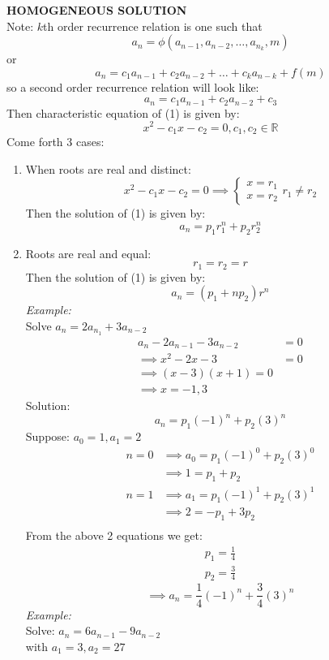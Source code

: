 \documentclass[11pt,letterpaper]{article}
\newenvironment{example}                             
        {\noindent\textit{Example:}\\}
	{}
\begin{document}
\textbf{HOMOGENEOUS SOLUTION}\\
Note: $k$th order recurrence relation is one such that\[
  a_n = \phi(a_{n-1},a_{n-2},\dots,a_{n_k},m)
\]
or 
\[
  a_n = c_1a_{n-1} + c_2a_{n-2} + \dots + c_ka_{n-k} +  f(m)
\]
so a second order recurrence relation will look like:
\begin{equation}
  a_n = c_1a_{n-1} + c_2a_{n-2} + c_3
\end{equation}
Then characteristic equation of (1) is given by:
\[
  x^2 - c_1x - c_2 = 0, c_1,c_2 \in \mathbb{R}
\]
Come forth 3 cases: 
\begin{enumerate}
  \item When roots are real and distinct: \\
    \[
      x^2 - c_1x-c_2 = 0 \implies\begin{cases}
        x = r_1 \\ 
        x = r_2
      \end{cases}
      r_1 \neq r_2
    \]
    Then the solution of (1) is given by:
    \[
      a_n = p_1r_1^n + p_2 r_2^n
    \]
  \item Roots are real and equal:
    \[
      r_1 = r_2 = r
    \]
    Then the solution of (1) is given by:
    \[
      a_n = (p_1 + np_2) r^n
    \]
    \begin{example}
      Solve $a_n = 2a_{n_1} + 3a_{n-2}$
      \begin{align*}
        a_n - 2a_{n-1} - 3a_{n-2} &= 0\\
        \implies x^2 - 2x - 3 &= 0\\
        \implies (x-3)(x+1) = 0\\ 
        \implies x = -1, 3
      \end{align*}
      Solution: 
      \[
        a_n = p_1(-1)^n + p_2(3)^n
      \]
      Suppose: $a_0 = 1, a_1 = 2$
      \begin{align*}
        n = 0 &\implies a_0 = p_1(-1)^0 + p_2(3)^0\\
              &\implies 1 = p_1 + p_2\\
        n = 1 &\implies a_1 = p_1(-1)^1 + p_2(3)^1\\
              &\implies 2 = -p_1 + 3p_2\\
      \end{align*}
      From the above 2 equations we get:
      \begin{align*}
        p_1 = \frac{1}{4}\\
        p_2 = \frac{3}{4}
      \end{align*}
      \[
        \implies a_n = \frac{1}{4} (-1)^n + \frac{3}{4} (3)^n
      \]
    \end{example}
    \begin{example}
      Solve: $a_n = 6a_{n-1} - 9a_{n-2}$\\
      with $a_1 = 3, a_2 = 27$
    \end{example}
\end{enumerate}
\end{document}
